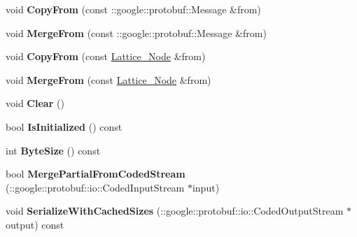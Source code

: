 \begin{DoxyCompactItemize}
\item 
\hypertarget{classlattice_1_1Lattice__Node_a380df579ad1735c2126e4eba47e6f5e1}{
void {\bfseries CopyFrom} (const ::google::protobuf::Message \&from)}
\label{classlattice_1_1Lattice__Node_a380df579ad1735c2126e4eba47e6f5e1}

\item 
\hypertarget{classlattice_1_1Lattice__Node_a2fff3c85762dbffdb5f4db8a0d1f1de2}{
void {\bfseries MergeFrom} (const ::google::protobuf::Message \&from)}
\label{classlattice_1_1Lattice__Node_a2fff3c85762dbffdb5f4db8a0d1f1de2}

\item 
\hypertarget{classlattice_1_1Lattice__Node_a83833df54b108547003ddcd089e11495}{
void {\bfseries CopyFrom} (const \hyperlink{classlattice_1_1Lattice__Node}{Lattice\_\-Node} \&from)}
\label{classlattice_1_1Lattice__Node_a83833df54b108547003ddcd089e11495}

\item 
\hypertarget{classlattice_1_1Lattice__Node_a381edbfaee298b75d2326f7c2722a395}{
void {\bfseries MergeFrom} (const \hyperlink{classlattice_1_1Lattice__Node}{Lattice\_\-Node} \&from)}
\label{classlattice_1_1Lattice__Node_a381edbfaee298b75d2326f7c2722a395}

\item 
\hypertarget{classlattice_1_1Lattice__Node_a883603a4abfa63e055042e72c9a7d771}{
void {\bfseries Clear} ()}
\label{classlattice_1_1Lattice__Node_a883603a4abfa63e055042e72c9a7d771}

\item 
\hypertarget{classlattice_1_1Lattice__Node_a66f8bfa1d8df568cd212ecd39fc29e6c}{
bool {\bfseries IsInitialized} () const }
\label{classlattice_1_1Lattice__Node_a66f8bfa1d8df568cd212ecd39fc29e6c}

\item 
\hypertarget{classlattice_1_1Lattice__Node_a8af617033ad1ddf55c04869bf0eba7c8}{
int {\bfseries ByteSize} () const }
\label{classlattice_1_1Lattice__Node_a8af617033ad1ddf55c04869bf0eba7c8}

\item 
\hypertarget{classlattice_1_1Lattice__Node_a3d2d830c5d2004d848eefdb34ce4cd70}{
bool {\bfseries MergePartialFromCodedStream} (::google::protobuf::io::CodedInputStream $\ast$input)}
\label{classlattice_1_1Lattice__Node_a3d2d830c5d2004d848eefdb34ce4cd70}

\item 
\hypertarget{classlattice_1_1Lattice__Node_a9ba35eb712235a58d484d2f5d786664a}{
void {\bfseries SerializeWithCachedSizes} (::google::protobuf::io::CodedOutputStream $\ast$output) const }
\label{classlattice_1_1Lattice__Node_a9ba35eb712235a58d484d2f5d786664a}


\end{DoxyCompactItemize}

